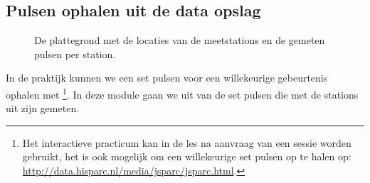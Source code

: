 \subsection{Pulsen ophalen uit de \hisparc data opslag}

\begin{figure}[ht]
    \centering
    \caption{De plattegrond met de locaties van de meetstations
             en de gemeten pulsen per station.}
    \label{fig:coincidence}
\end{figure}

In de praktijk kunnen we een set pulsen voor een willekeurige
gebeurtenis ophalen met \jsparc%
\footnote{Het interactieve practicum \jsparc kan in de les na aanvraag
van een sessie worden gebruikt, het is ook mogelijk om een willekeurige
set pulsen op te halen op:
\url{http://data.hisparc.nl/media/jsparc/jsparc.html}.%
}. In deze module gaan we uit van de set pulsen die met de stations
uit  zijn gemeten.

